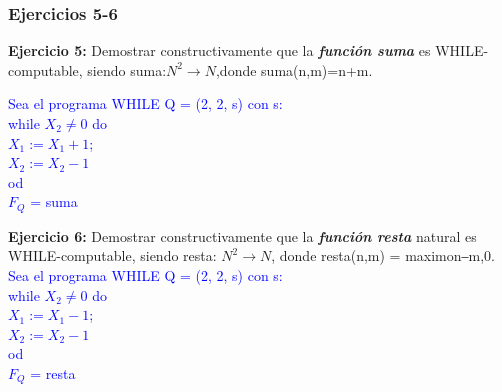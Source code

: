 \documentclass[xcolor=table]{beamer}
\begin{document}
\begin{frame}[fragile]\frametitle{Ejercicios 5-6} \scriptsize

\textbf{Ejercicio 5:}  Demostrar	constructivamente	que	la	\textbf{\textit{función suma}}	es	WHILE-computable,	siendo	suma:$N^2 \rightarrow N$,donde suma(n,m)=n+m.	
\hspace{0.2cm}

\vspace{0.1cm }\textcolor{blue}{Sea	el	programa	WHILE	Q	=	(2,	2,	s)	con	s:	\\
\hspace{0.2cm }while	$X_2	\neq 0$	do\\	
\hspace{0.4cm }$X_1	:=X_1+1$;	\\
\hspace{0.4cm }$X_2	:=X_2-1$	\\
\hspace{0.2cm }od	\\
$F_Q$ =	suma}

\hspace{0.4cm}

\textbf{Ejercicio 6:} Demostrar	constructivamente	que	la	\textit{\textbf{función resta}}	natural	es	WHILE-computable,	siendo	resta:	$N^2	\rightarrow N$,	donde resta(n,m)	=	maximo{n‒m,0}.	
\vspace{0.1cm }\textcolor{blue}{Sea	el	programa	WHILE	Q	=	(2,	2,	s)	con	s:	\\
\hspace{0.2cm }while	$X_2	\neq 0$	do\\	
\hspace{0.4cm }$X_1	:=X_1-1$;	\\
\hspace{0.4cm }$X_2	:=X_2-1$	\\
\hspace{0.2cm }od	\\
$F_Q$ =	resta}


\end{frame}
\end{document}
